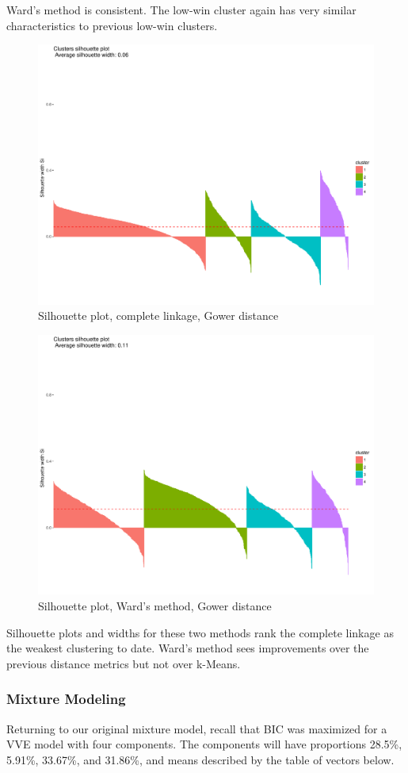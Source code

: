 \documentclass[10pt,a4paper, hidelinks]{article} %
\begin{document}
Ward's method is consistent.  The low-win cluster again has very similar characteristics to previous low-win clusters.

\begin{figure}[H]
	\centering
	\includegraphics[width=0.7\linewidth]{"../fig/compsil3"}
	\caption{Silhouette plot, complete linkage, Gower distance}
\end{figure}

\begin{figure}[H]
	\centering
	\includegraphics[width=0.7\linewidth]{"../fig/wardsil3"}
	\caption{Silhouette plot, Ward's method, Gower distance}
\end{figure}

Silhouette plots and widths for these two methods rank the complete linkage as the weakest clustering to date.  Ward's method sees improvements over the previous distance metrics but not over k-Means.

\subsubsection{Mixture Modeling}

Returning to our original mixture model, recall that BIC was maximized for a VVE model with four components.  The components will have proportions 28.5\%, 5.91\%, 33.67\%, and 31.86\%, and means described by the table of vectors below.
\end{document}
